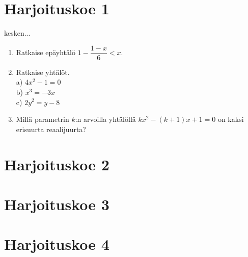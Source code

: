 \section{Harjoituskoe 1}

kesken... 
\begin{enumerate}
\item Ratkaise epäyhtälö $1-\dfrac{1-x}{6}<x$.
\item Ratkaise yhtälöt. \\ a) $4x^2-1=0$ \\ b) $x^3=-3x$ \\ c) $2y^2=y-8$
\item Millä parametrin $k$:n arvoilla yhtälöllä $kx^2-(k+1)x+1=0$ on kaksi erisuurta reaalijuurta? 

\end{enumerate}

\section{Harjoituskoe 2}


\section{Harjoituskoe 3}


\section{Harjoituskoe 4}